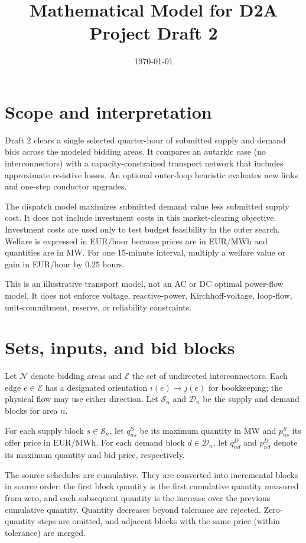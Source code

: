 \documentclass[11pt]{article}
\title{Mathematical Model for D2A Project Draft 2}
\author{}
\date{\today}
\begin{document}
\maketitle

\section{Scope and interpretation}

Draft 2 clears a single selected quarter-hour of submitted supply and demand
bids across the modeled bidding areas. It compares an autarkic case (no
interconnectors) with a capacity-constrained transport network that includes
approximate resistive losses. An optional outer-loop heuristic evaluates new
links and one-step conductor upgrades.

The dispatch model maximizes submitted demand value less submitted supply cost.
It does not include investment costs in this market-clearing objective.
Investment costs are used only to test budget feasibility in the outer search.
Welfare is expressed in EUR/hour because prices are in EUR/MWh and quantities
are in MW. For one 15-minute interval, multiply a welfare value or gain in
EUR/hour by \(0.25\) hours.

This is an illustrative transport model, not an AC or DC optimal power-flow
model. It does not enforce voltage, reactive-power, Kirchhoff-voltage, loop-flow,
unit-commitment, reserve, or reliability constraints.

\section{Sets, inputs, and bid blocks}

Let \(\mathcal{N}\) denote bidding areas and \(\mathcal{E}\) the set of
undirected interconnectors. Each edge \(e\in\mathcal{E}\) has a designated
orientation \(i(e)\to j(e)\) for bookkeeping; the physical flow may use either
direction. Let \(\mathcal{S}_n\) and \(\mathcal{D}_n\) be the supply and demand
blocks for area \(n\).

For each supply block \(s\in\mathcal{S}_n\), let \(q^S_{ns}\) be its maximum
quantity in MW and \(p^S_{ns}\) its offer price in EUR/MWh. For each demand
block \(d\in\mathcal{D}_n\), let \(q^D_{nd}\) and \(p^D_{nd}\) denote its maximum
quantity and bid price, respectively.

The source schedules are cumulative. They are converted into incremental
blocks in source order: the first block quantity is the first cumulative
quantity measured from zero, and each subsequent quantity is the increase over
the previous cumulative quantity. Quantity decreases beyond tolerance are
rejected. Zero-quantity steps are omitted, and adjacent blocks with the same
price (within tolerance) are merged.
\end{document}
